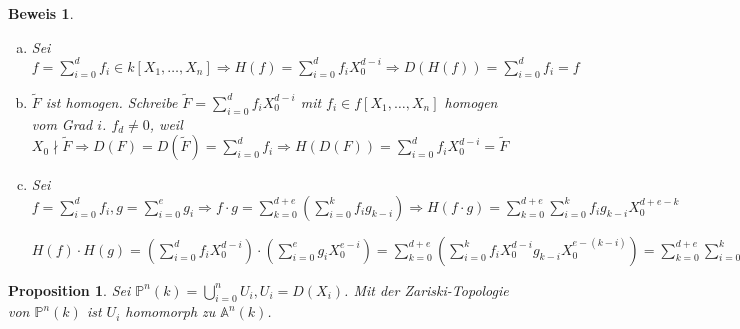\documentclass[a4paper, 12pt, numbers=noendperiod, chapterprefix=true, headsepline]{scrbook}
\theoremstyle{break}
\newtheorem{Prop}[Def]{Proposition}
\theoremstyle{nonumberbreak}
\newtheorem{Bew}{Beweis}
\theoremstyle{nonumberplain}
\newcommand{\Sum}{\sum\limits}
\newcommand{\A}{\mathbb{A}}
\newcommand{\IP}{\mathbb{P}}%
\begin{document}
\begin{Bew}\begin{enumerate}[a)]
\item[c)]
	Sei $f=\Sum_{i=0}^df_i\in k[X_1,\ldots ,X_n] \Rightarrow H(f)=\Sum_{i=0}^df_iX_0^{d-i} \Rightarrow D(H(f))=\Sum_{i=0}^df_i=f$
\item[d)]
	$\widetilde F$ ist homogen. Schreibe $\widetilde F=\sum_{i=0}^df_iX_0^{d-i}$ mit $f_i\in f[X_1,\ldots ,X_n]$ homogen vom Grad $i$. $f_d\ne0$, weil $X_0\nmid \widetilde F \Rightarrow D(F)=D(\widetilde F)=\sum_{i=0}^df_i \Rightarrow H(D(F))=\sum_{i=0}^df_iX_0^{d-i}=\widetilde F$
\item[e)]
	Sei $f=\sum_{i=0}^df_i, g= \sum_{i=0}^eg_i \Rightarrow f\cdot g=\sum_{k=0}^{d+e}(\sum_{i=0}^kf_ig_{k-i}) \Rightarrow H(f\cdot g)=\sum_{k=0}^{d+e}\sum_{i=0}^kf_ig_{k-i}X_0^{d+e-k}$
	
	$H(f)\cdot H(g)=(\sum_{i=0}^df_iX_0^{d-i})\cdot(\sum_{i=0}^eg_iX_0^{e-i}) = \sum_{k=0}^{d+e}(\sum_{i=0}^kf_iX_0^{d-i}g_{k-i}X_0^{e-(k-i)})=\sum_{k=0}^{d+e}\sum_{i=0}^kf_ig_{k-i}X_0^{d+e-k}$
\end{enumerate}\end{Bew}

\begin{Prop}
Sei $\IP^n(k)=\bigcup_{i=0}^nU_i, U_i=D(X_i)$. Mit der Zariski-Topologie von $\IP^n(k)$ ist $U_i$ homomorph zu $\A^n(k)$.
\end{Prop}
\end{document}
